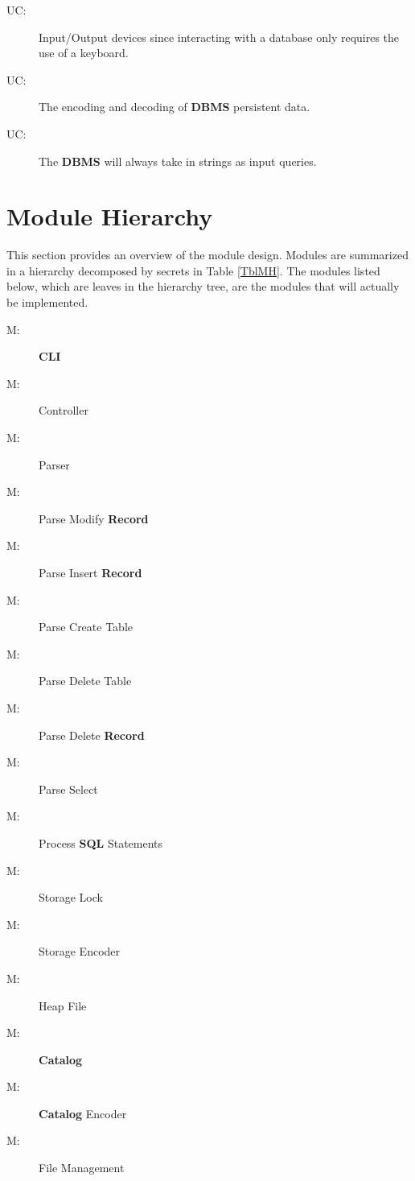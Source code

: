 \documentclass[12pt, titlepage]{article}
\newcounter{ucnum}
\newcommand{\uctheucnum}{UC\theucnum}
\newcounter{mnum}
\newcommand{\mthemnum}{M\themnum}
\begin{document}
\begin{description}
\item[ \uctheucnum \label{uc1}:] Input/Output devices since interacting with a database only requires the use of a keyboard.
\item[ \uctheucnum \label{uc2}:] The encoding and decoding of \textbf{DBMS} persistent data.
\item[ \uctheucnum \label{uc3}:] The \textbf{DBMS} will always take in strings as input queries.
\end{description}

\section{Module Hierarchy} \label{SecMH}

This section provides an overview of the module design. Modules are summarized
in a hierarchy decomposed by secrets in Table \ref{TblMH}. The modules listed
below, which are leaves in the hierarchy tree, are the modules that will
actually be implemented.

\begin{description}
\item [ \mthemnum \label{m1}:] \textbf{CLI}
\item [ \mthemnum \label{m2}:] Controller
\item [ \mthemnum \label{m3}:] Parser
\item [ \mthemnum \label{m4}:] Parse Modify \textbf{Record}
\item [ \mthemnum \label{m5}:] Parse Insert \textbf{Record}
\item [ \mthemnum \label{m6}:] Parse Create Table
\item [ \mthemnum \label{m7}:] Parse Delete Table
\item [ \mthemnum \label{m8}:] Parse Delete \textbf{Record}
\item [ \mthemnum \label{m9}:] Parse Select
\item [ \mthemnum \label{m10}:] Process \textbf{SQL} Statements
\item [ \mthemnum \label{m11}:] Storage Lock
\item [ \mthemnum \label{m12}:] Storage Encoder
\item [ \mthemnum \label{m13}:] Heap File
\item [ \mthemnum \label{m14}:] \textbf{Catalog}
\item [ \mthemnum \label{m15}:] \textbf{Catalog} Encoder
\item [ \mthemnum \label{m16}:] File Management
\end{description}
\end{document}

